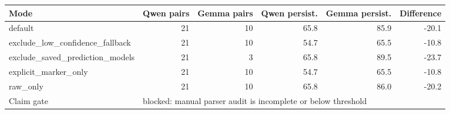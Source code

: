 \begin{tabular}{lrrrrr}
\toprule
Mode & Qwen pairs & Gemma pairs & Qwen persist. & Gemma persist. & Difference \\
\midrule
default & 21 & 10 & 65.8 & 85.9 & -20.1 \\
exclude\_low\_confidence\_fallback & 21 & 10 & 54.7 & 65.5 & -10.8 \\
exclude\_saved\_prediction\_models & 21 & 3 & 65.8 & 89.5 & -23.7 \\
explicit\_marker\_only & 21 & 10 & 54.7 & 65.5 & -10.8 \\
raw\_only & 21 & 10 & 65.8 & 86.0 & -20.2 \\
\midrule
Claim gate & \multicolumn{5}{l}{blocked: manual parser audit is incomplete or below threshold} \\
\bottomrule
\end{tabular}
